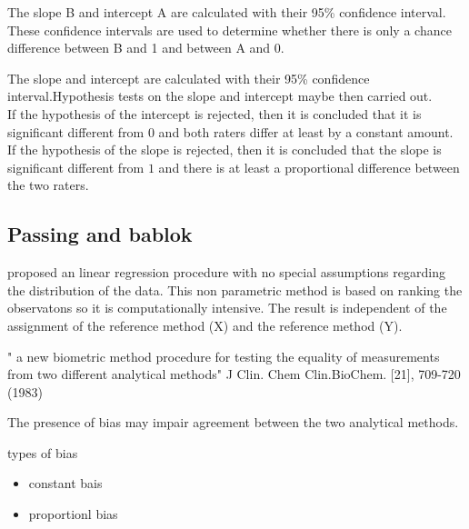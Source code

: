 \documentclass[MAIN.tex]{subfiles}
\begin{document}
The slope B and intercept A are calculated with their 95\% confidence interval. These confidence intervals are used to determine whether there is only a chance difference between B and 1 and between A and 0.


 The slope and intercept  are calculated with their 95\% confidence interval.Hypothesis tests on the slope and intercept maybe then
carried out.\\

If the hypothesis of the intercept is rejected, then it is concluded that it is significant different from $0$ and both
raters differ at least by a constant amount.
	\\
If the hypothesis of the slope is rejected, then it is concluded that the slope is significant different from $1$ and there is at
least a proportional difference between the two raters.




\subsection{Passing and bablok}
proposed an linear regression procedure with no special assumptions regarding the distribution of the data.
This non parametric method is based on ranking the observatons so it is computationally intensive.
The result is independent of the assignment of the reference method (X) and the reference method (Y).

" a new biometric method procedure for testing the equality of measurements from two different analytical methods"
J Clin. Chem Clin.BioChem. [21], 709-720 (1983)

The presence of bias may impair agreement between the two analytical methods.

types of bias

\begin{itemize}
	\item constant bais
	\item proportionl bias
\end{itemize}










\end{document}

